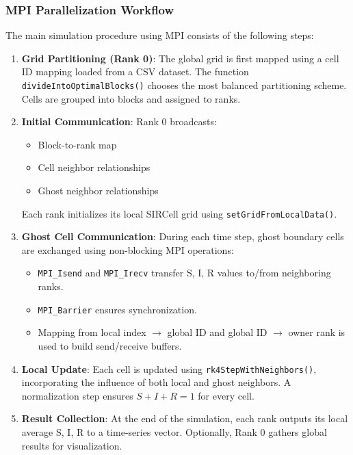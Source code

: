 \subsubsection*{MPI Parallelization Workflow}
The main simulation procedure using MPI consists of the following steps:
\begin{enumerate}
    \item \textbf{Grid Partitioning (Rank 0)}: The global grid is first mapped using a cell ID mapping loaded from a CSV dataset. The function\\\texttt{divideIntoOptimalBlocks()} chooses the most balanced partitioning scheme. Cells are grouped into blocks and assigned to ranks.
    
    \item \textbf{Initial Communication}: Rank 0 broadcasts:
    \begin{itemize}
        \item Block-to-rank map
        \item Cell neighbor relationships
        \item Ghost neighbor relationships
    \end{itemize}
    Each rank initializes its local SIRCell grid using \texttt{setGridFromLocalData()}.

    \item \textbf{Ghost Cell Communication}: During each time step, ghost boundary cells are exchanged using non-blocking MPI operations:
    \begin{itemize}
        \item \texttt{MPI\_Isend} and \texttt{MPI\_Irecv} transfer S, I, R values to/from neighboring ranks.
        \item \texttt{MPI\_Barrier} ensures synchronization.
        \item Mapping from local index $\rightarrow$ global ID and global ID $\rightarrow$ owner rank is used to build send/receive buffers.
    \end{itemize}

    \item \textbf{Local Update}: Each cell is updated using \texttt{rk4StepWithNeighbors()}, incorporating the influence of both local and ghost neighbors. A normalization step ensures \( S + I + R = 1 \) for every cell.

    \item \textbf{Result Collection}: At the end of the simulation, each rank outputs its local average S, I, R to a time-series vector. Optionally, Rank 0 gathers global results for visualization.
\end{enumerate}

